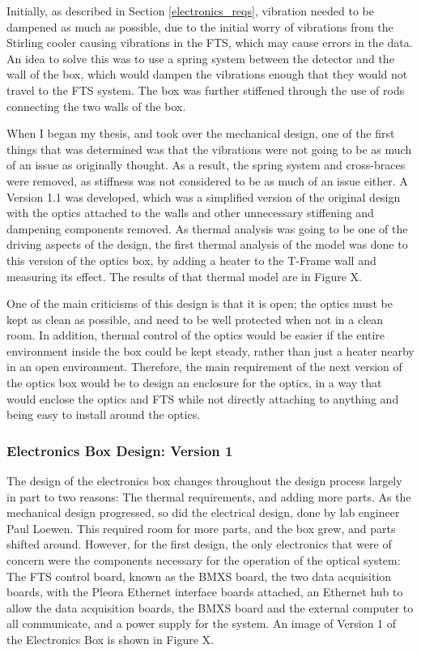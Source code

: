 Initially, as described in Section \ref{electronics_reqs}, vibration needed to be dampened as much as possible, due to the initial worry of vibrations from the Stirling cooler causing vibrations in the FTS, which may cause errors in the data. An idea to solve this was to use a spring system between the detector and the wall of the box, which would dampen the vibrations enough that they would not travel to the FTS system. The box was further stiffened through the use of rods connecting the two walls of the box. 

When I began my thesis, and took over the mechanical design, one of the first things that was determined was that the vibrations were not going to be as much of an issue as originally thought. As a result, the spring system and cross-braces were removed, as stiffness was not considered to be as much of an issue either. A Version 1.1 was developed, which was a simplified version of the original design with the optics attached to the walls and other unnecessary stiffening and dampening components removed. As thermal analysis was going to be one of the driving aspects of the design, the first thermal analysis of the model was done to this version of the optics box, by adding a heater to the T-Frame wall and measuring its effect. The results of that thermal model are in Figure X.



One of the main criticisms of this design is that it is open; the optics must be kept as clean as possible, and need to be well protected when not in a clean room. In addition, thermal control of the optics would be easier if the entire environment inside the box could be kept steady, rather than just a heater nearby in an open environment. Therefore, the main requirement of the next version of the optics box would be to design an enclosure for the optics, in a way that would enclose the optics and FTS while not directly attaching to anything and being easy to install around the optics. 

\subsubsection{Electronics Box Design: Version 1}
The design of the electronics box changes throughout the design process largely in part to two reasons: The thermal requirements, and adding more parts. As the mechanical design progressed, so did the electrical design, done by lab engineer Paul Loewen. This required room for more parts, and the box grew, and parts shifted around. However, for the first design, the only electronics that were of concern were the components necessary for the operation of the optical system: The FTS control board, known as the BMXS board, the two data acquisition boards, with the Pleora Ethernet interface boards attached, an Ethernet hub to allow the data acquisition boards, the BMXS board and the external computer to all communicate, and a power supply for the system. An image of Version 1 of the Electronics Box is shown in Figure X.

